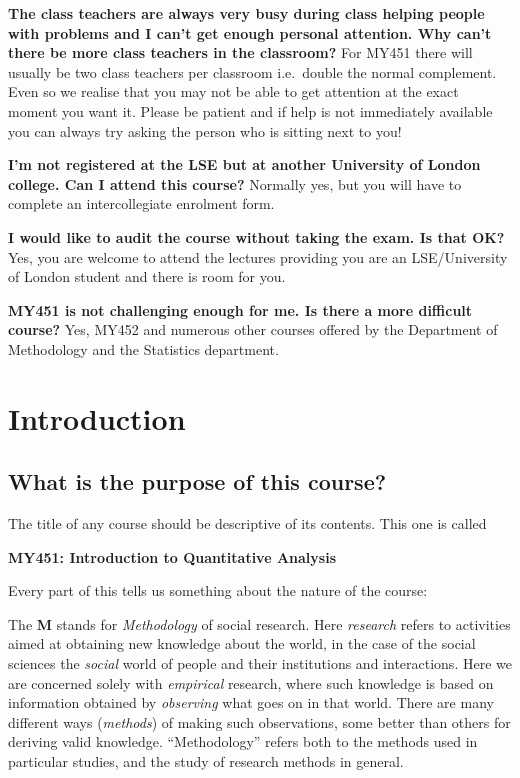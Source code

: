 \documentclass[11pt,a4paper,openany]{book}
\begin{document}
\textbf{The class teachers are always very busy during class helping
people with problems and I can't get enough personal attention. Why
can't there be more class teachers in the classroom?} For MY451 there
will usually be two class teachers per classroom i.e.~double the normal
complement. Even so we realise that you may not be able to get attention
at the exact moment you want it. Please be patient and if help is not
immediately available you can always try asking the person who is
sitting next to you!

\textbf{I'm not registered at the LSE but at another University of
London college. Can I attend this course?} Normally yes, but you will
have to complete an intercollegiate enrolment form.

\textbf{I would like to audit the course without taking the exam. Is
that OK?} Yes, you are welcome to attend the lectures providing you are
an LSE/University of London student and there is room for you.

\textbf{MY451 is not challenging enough for me. Is there a more
difficult course?} Yes, MY452 and numerous other courses offered by the
Department of Methodology and the Statistics department.

\tableofcontents

\mainmatter

\chapter{Introduction}\label{c-intro}

\section{What is the purpose of this course?}\label{s-intro-purpose}

The title of any course should be descriptive of its contents. This one
is called

\textbf{MY451: Introduction to Quantitative Analysis}

Every part of this tells us something about the nature of the course:

The \textbf{M} stands for \emph{Methodology} of social research. Here
\emph{research} refers to activities aimed at obtaining new knowledge
about the world, in the case of the social sciences the \emph{social}
world of people and their institutions and interactions. Here we are
concerned solely with \emph{empirical} research, where such knowledge is
based on information obtained by \emph{observing} what goes on in that
world. There are many different ways (\emph{methods}) of making such
observations, some better than others for deriving valid knowledge.
``Methodology'' refers both to the methods used in particular studies,
and the study of research methods in general.
\end{document}

